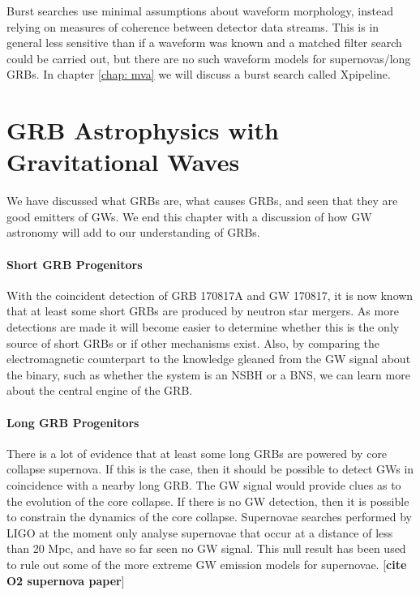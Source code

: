 \documentclass[11pt]{cuthesis}
\begin{document}
Burst searches use minimal assumptions about waveform morphology, instead relying on measures of coherence between detector data streams. This is in general less sensitive than if a waveform was known and a matched filter search could be carried out, but there are no such waveform models for supernovas/long GRBs. In chapter \ref{chap: mva} we will discuss a burst search called Xpipeline. 

\section{GRB Astrophysics with Gravitational Waves}
We have discussed what GRBs are, what causes GRBs, and seen that they are good emitters of GWs. We end this chapter with a discussion of how GW astronomy will add to our understanding of GRBs. 

\paragraph{Short GRB Progenitors}
With the coincident detection of GRB 170817A and GW 170817, it is now known that at least some short GRBs are produced by neutron star mergers. As more detections are made it will become easier to determine whether this is the only source of short GRBs or if other mechanisms exist. Also, by comparing the electromagnetic counterpart to the knowledge gleaned from the GW signal about the binary, such as whether the system is an NSBH or a BNS, we can learn more about the central engine of the GRB. 

\paragraph{Long GRB Progenitors}
There is a lot of evidence that at least some long GRBs are powered by core collapse supernova. If this is the case, then it should be possible to detect GWs in coincidence with a nearby long GRB. The GW signal would provide clues as to the evolution of the core collapse. If there is no GW detection, then it is possible to constrain the dynamics of the core collapse. Supernovae searches performed by LIGO at the moment only analyse supernovae that occur at a distance of less than 20 Mpc, and have so far seen no GW signal. This null result has been used to rule out some of the more extreme GW emission models for supernovae. [\textbf{cite O2 supernova paper}]
\end{document}
